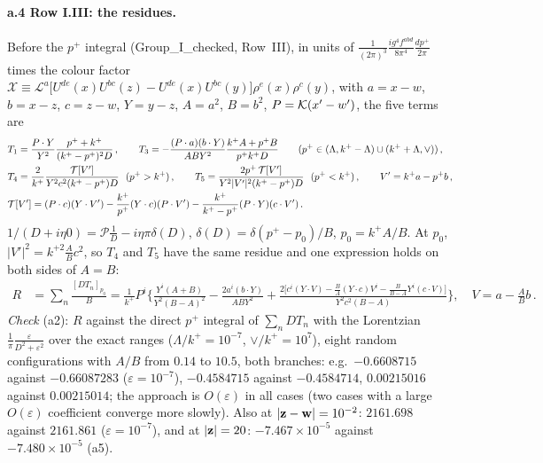 \paragraph{a.4 Row I.III: the residues.} Before the $p^+$ integral (Group\_I\_checked, Row~III), in units of $\frac{1}{(2\pi)^3}\frac{ig^4f^{abd}}{8\pi^4}\frac{dp^+}{2\pi}$ times the colour factor $\mathcal X\equiv\mathcal L^a\big[U^{de}(x)U^{bc}(z)-U^{de}(x)U^{bc}(y)\big]\rho^e(x)\rho^c(y)$, with $a=x-w$, $b=x-z$, $c=z-w$, $Y=y-z$, $A=a^2$, $B=b^2$, $P=\mathcal{K}(x'-w')$, the five terms are
\begin{align}
&T_1=\frac{P\cdot Y}{Y^2}\frac{p^++k^+}{(k^+-p^+)^2D}\,,\qquad T_3=-\frac{(P\cdot a)(b\cdot Y)}{ABY^2}\frac{k^+A+p^+B}{p^+k^+D}\qquad(p^+\in(\Lambda,k^+-\Lambda)\cup(k^++\Lambda,\vee))\,,\notag\\
&T_4=\frac{2}{k^+}\frac{\mathcal T[V']}{Y^2c^2(k^+-p^+)D}\ \ (p^+>k^+)\,,\qquad T_5=\frac{2p^+\,\mathcal T[V']}{Y^2|V'|^2(k^+-p^+)D}\ \ (p^+<k^+)\,,\qquad V'=k^+a-p^+b\,,\notag\\
&\mathcal T[V']=(P\cdot c)(Y\cdot V')-\frac{k^+}{p^+}(Y\cdot c)(P\cdot V')-\frac{k^+}{k^+-p^+}(P\cdot Y)(c\cdot V')\,.
\end{align}
$1/(D+i\eta0)=\mathcal P\frac1D-i\eta\pi\delta(D)$, $\delta(D)=\delta(p^+-p_0)/B$, $p_0=k^+A/B$. At $p_0$, $|V'|^2=k^{+2}\frac AB c^2$, so $T_4$ and $T_5$ have the same residue and one expression holds on both sides of $A=B$:
\begin{align}\label{pr:R}
R&=\sum_n\frac{[DT_n]_{p_0}}{B}=\frac{1}{k^+}P^i\Bigg\{\frac{Y^i(A+B)}{Y^2(B-A)^2}-\frac{2a^i(b\cdot Y)}{ABY^2}+\frac{2\big[c^i(Y\cdot V)-\frac BA(Y\cdot c)V^i-\frac{B}{B-A}Y^i(c\cdot V)\big]}{Y^2c^2(B-A)}\Bigg\},\quad V=a-\tfrac ABb\,.
\end{align}
\emph{Check} (a2): $R$ against the direct $p^+$ integral of $\sum_nDT_n$ with the Lorentzian $\frac1\pi\frac{\varepsilon}{D^2+\varepsilon^2}$ over the exact ranges ($\Lambda/k^+=10^{-7}$, $\vee/k^+=10^7$), eight random configurations with $A/B$ from $0.14$ to $10.5$, both branches: e.g.\ $-0.6608715$ against $-0.66087283$ ($\varepsilon=10^{-7}$), $-0.4584715$ against $-0.4584714$, $0.00215016$ against $0.00215014$; the approach is $O(\varepsilon)$ in all cases (two cases with a large $O(\varepsilon)$ coefficient converge more slowly). Also at $|\mathbf{z}-\mathbf{w}|=10^{-2}$: $2161.698$ against $2161.861$ ($\varepsilon=10^{-7}$), and at $|\mathbf{z}|=20$: $-7.467\times10^{-5}$ against $-7.480\times10^{-5}$ (a5).

